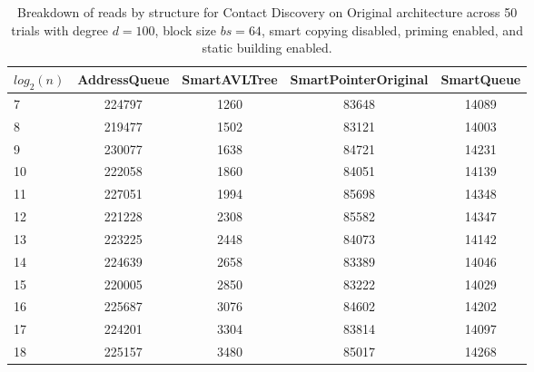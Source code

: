 \begin{table}[]
\centering
\begin{tabular}{|l|c|c|c|c|}
$log_2(n)$ & AddressQueue & SmartAVLTree & SmartPointerOriginal & SmartQueue \\ \hline
7 & 224797 & 1260 & 83648 & 14089 \\ \hline
8 & 219477 & 1502 & 83121 & 14003 \\ \hline
9 & 230077 & 1638 & 84721 & 14231 \\ \hline
10 & 222058 & 1860 & 84051 & 14139 \\ \hline
11 & 227051 & 1994 & 85698 & 14348 \\ \hline
12 & 221228 & 2308 & 85582 & 14347 \\ \hline
13 & 223225 & 2448 & 84073 & 14142 \\ \hline
14 & 224639 & 2658 & 83389 & 14046 \\ \hline
15 & 220005 & 2850 & 83222 & 14029 \\ \hline
16 & 225687 & 3076 & 84602 & 14202 \\ \hline
17 & 224201 & 3304 & 83814 & 14097 \\ \hline
18 & 225157 & 3480 & 85017 & 14268 \\ \hline
\end{tabular}
\caption{Breakdown of reads by structure for Contact Discovery on Original architecture across 50 trials with degree $d=100$, block size $bs=64$, smart copying disabled, priming enabled, and static building enabled.}
    \label{tab:reads_by_structure_cd_d100_bs64_trials50_copiesfalse_primetrue_staticinsertiontrue_ptoriginal_movefalse}
\end{table}

